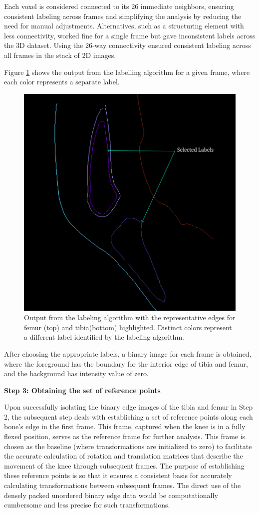 \documentclass{micro-econ-thesis}
\begin{document}
Each voxel is considered connected to its 26 immediate neighbors, ensuring consistent labeling across frames and simplifying the analysis by reducing the need for manual adjustments.  Alternatives, such as a structuring element with less connectivity, worked fine for a single frame but gave inconsistent labels across the 3D dataset. Using the 26-way connectivity ensured consistent labeling across all frames in the stack of 2D images. 

Figure \ref{fig:labelimg} shows the output from the labelling algorithm for a given frame, where each color represents a separate label. 

\begin{figure}[H]
	\centering
	\includegraphics[width=0.7\linewidth]{label_selected}
	\caption{Output from the labeling algorithm with the representative edges for femur (top) and tibia(bottom) highlighted. Distinct colors represent a different label identified by the labeling algorithm.}
	\label{fig:labelimg}
\end{figure}
 
After choosing the appropriate labels, a binary image for each frame is obtained, where the foreground has the boundary for the interior edge of tibia and femur, and the background has intensity value of zero.   

\textbf{Step 3: Obtaining the set of reference points}

Upon successfully isolating the binary edge images of the tibia and femur in Step 2, the subsequent step deals with establishing a set of reference points along each bone's edge in the first frame. This frame, captured when the knee is in a fully flexed position, serves as the reference frame for further analysis.  This frame is chosen as the baseline (where transformations are initialized to zero) to facilitate the accurate calculation of rotation and translation matrices that describe the movement of the knee through subsequent frames. The purpose of establishing these reference points is so that it ensures a consistent basis for accurately calculating transformations between subsequent frames. The direct use of the densely packed unordered binary edge data would be computationally cumbersome and less precise for such transformations.
\end{document}
